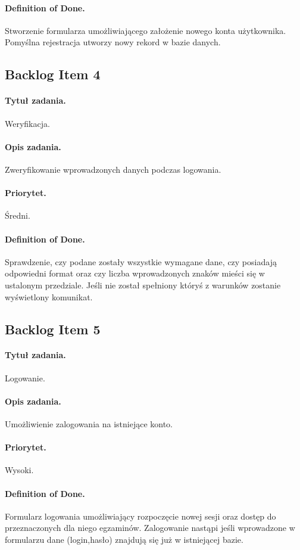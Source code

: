 \documentclass[a4paper]{article}
\begin{document}
\paragraph{Definition of Done.} Stworzenie formularza umożliwiającego założenie nowego konta użytkownika. Pomyślna rejestracja utworzy nowy rekord w bazie danych.

\subsection{Backlog Item 4}
\paragraph{Tytuł zadania.} Weryfikacja.
\paragraph{Opis zadania.} Zweryfikowanie wprowadzonych danych podczas logowania.
\paragraph{Priorytet.} Średni.
\paragraph{Definition of Done.} Sprawdzenie, czy podane zostały wszystkie wymagane dane, czy posiadają odpowiedni format oraz czy liczba wprowadzonych znaków mieści się w ustalonym przedziale. Jeśli nie został spełniony któryś z warunków zostanie wyświetlony komunikat.

\subsection{Backlog Item 5}
\paragraph{Tytuł zadania.} Logowanie.
\paragraph{Opis zadania.} Umożliwienie zalogowania na istniejące konto.
\paragraph{Priorytet.} Wysoki.
\paragraph{Definition of Done.} Formularz logowania umożliwiający rozpoczęcie nowej sesji oraz dostęp do przeznaczonych dla niego egzaminów. Zalogowanie nastąpi jeśli wprowadzone w formularzu dane (login,hasło) znajdują się już w istniejącej bazie.
\end{document}
